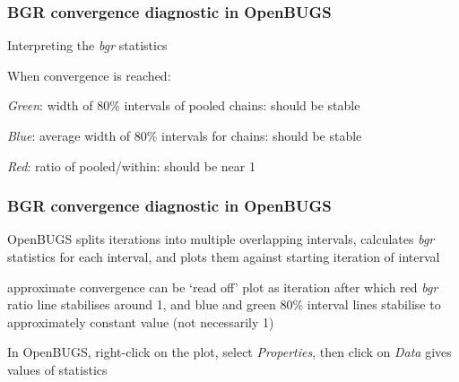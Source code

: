  \begin{frame}
\frametitle{BGR convergence diagnostic in OpenBUGS}

\begin{center}
\end{center}
\centerline{Interpreting the \emph{bgr} statistics}\vspace{2mm}
When convergence is reached:\vspace{2mm}
\bi
  \item \emph{Green}: width of 80\% intervals of pooled chains: should be stable\vspace{2mm}
  \item \emph{Blue}: average width of 80\% intervals for chains: should be stable\vspace{2mm}
  \item \emph{Red}: ratio of pooled/within: should be near 1\vspace{2mm}
\ei

\end{frame}


\begin{frame}

\frametitle{BGR convergence diagnostic in OpenBUGS}
\begin{center}
\end{center}
 \bi
  \item OpenBUGS splits iterations into multiple overlapping
  intervals, calculates \emph{bgr} statistics for each interval,
  and plots them against starting iteration of interval\vspace{0.5mm}
  \bi
  \item approximate convergence can be \lq read off' plot as
  iteration after which  red \emph{bgr} ratio line stabilises
  around 1, and blue and green 80\% interval lines
  stabilise to approximately constant value (not necessarily 1)\vspace{1mm}
  \ei
  \item In OpenBUGS, right-click on the plot, select \emph{Properties}, then click on \emph{Data} gives values of statistics
\ei

\end{frame}


